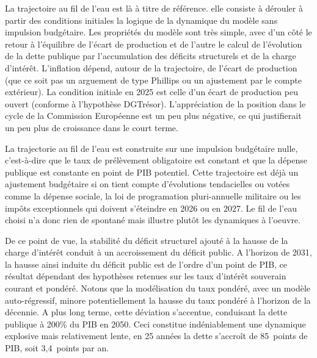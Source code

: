\documentclass[
  french,
  9pt,
  a4paper,
  DIV=11,
  twoside=semi]{scrreprt}
\begin{document}
La trajectoire au fil de l'eau est là à titre de référence. elle
consiste à dérouler à partir des conditions initiales la logique de la
dynamique du modèle sans impulsion budgétaire. Les propriétés du modèle
sont très simple, avec d'un côté le retour à l'équilibre de l'écart de
production et de l'autre le calcul de l'évolution de la dette publique
par l'accumulation des déficits structurels et de la charge d'intérêt.
L'inflation dépend, autour de la trajectoire, de l'écart de production
(que ce soit pas un arguement de type Phillips ou un ajustement par le
compte extérieur). La condition initiale en 2025 est celle d'un écart de
production peu ouvert (conforme à l'hypothèse DGTrésor). L'appréciation
de la position dans le cycle de la Commission Européenne est un peu plus
négative, ce qui justifierait un peu plus de croissance dans le court
terme.

La trajectorie au fil de l'eau est construite sur une impulsion
budgétaire nulle, c'est-à-dire que le taux de prélèvement obligatoire
est constant et que la dépense publique est constante en point de PIB
potentiel. Cette trajectoire est déjà un ajustement budgétaire si on
tient compte d'évolutions tendacielles ou votées comme la dépense
sociale, la loi de programation pluri-annuelle militaire ou les impôts
exceptionnels qui doivent s'éteindre en 2026 ou en 2027. Le fil de l'eau
choisi n'a donc rien de spontané mais illustre plutôt les dynamiques à
l'oeuvre.

De ce point de vue, la stabilité du déficit structurel ajouté à la
hausse de la charge d'intérêt conduit à un accroissement du déficit
public. A l'horizon de 2031, la hausse ainsi induite du déficit public
est de l'ordre d'un point de PIB, ce résultat dépendant des hypothèses
retenues sur les taux d'intérêt souverain courant et pondéré. Notons que
la modélisation du taux pondéré, avec un modèle auto-régressif, minore
potentiellement la hausse du taux pondéré à l'horizon de la décennie. A
plus long terme, cette déviation s'accentue, conduisant la dette
publique à 200\% du PIB en 2050. Ceci constitue indéniablement une
dynamique explosive mais relativement lente, en 25 années la dette
s'accroît de 85~points de PIB, soit 3,4~points par an.
\end{document}
